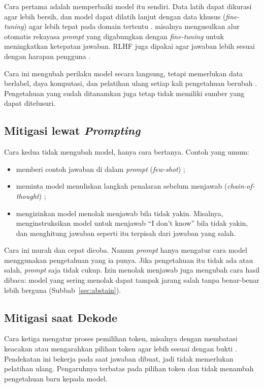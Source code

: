 Cara pertama adalah memperbaiki model itu sendiri. Data latih dapat dikurasi agar lebih bersih, dan model dapat dilatih lanjut dengan data khusus (\emph{fine-tuning}) agar lebih tepat pada domain tertentu \autocite{Patil2024, Hendawi2026}. \textcite{Hendawi2026} misalnya mengusulkan alur otomatis rekayasa \emph{prompt} yang digabungkan dengan \emph{fine-tuning} untuk meningkatkan ketepatan jawaban. RLHF juga dipakai agar jawaban lebih sesuai dengan harapan pengguna \autocite{Ouyang2022}.

Cara ini mengubah perilaku model secara langsung, tetapi memerlukan data berlabel, daya komputasi, dan pelatihan ulang setiap kali pengetahuan berubah \autocite{WangXL2026}. Pengetahuan yang sudah ditanamkan juga tetap tidak memiliki sumber yang dapat ditelusuri.

\subsection{Mitigasi lewat \emph{Prompting}}

Cara kedua tidak mengubah model, hanya cara bertanya. Contoh yang umum:
\begin{itemize}
  \item memberi contoh jawaban di dalam \emph{prompt} (\emph{few-shot})
\autocite{Brown2020};
  \item meminta model menuliskan langkah penalaran sebelum menjawab
(\emph{chain-of-thought}) \autocite{Wei2022};
  \item mengizinkan model menolak menjawab bila tidak yakin. Misalnya,
\textcite{Abedu2026} menginstruksikan model untuk menjawab ``I don't know'' bila tidak yakin, dan menghitung jawaban seperti itu terpisah dari jawaban yang salah.
\end{itemize}
Cara ini murah dan cepat dicoba. Namun \emph{prompt} hanya mengatur cara model menggunakan pengetahuan yang ia punya. Jika pengetahuan itu tidak ada atau salah, \emph{prompt} saja tidak cukup. Izin menolak menjawab juga mengubah cara hasil dibaca: model yang sering menolak dapat tampak jarang salah tanpa benar-benar lebih berguna (Subbab~\ref{sec:abstain}).

\subsection{Mitigasi saat Dekode}

Cara ketiga mengatur proses pemilihan token, misalnya dengan membatasi keacakan atau mengarahkan pilihan token agar lebih sesuai dengan bukti \autocite{Huang2025}. Pendekatan ini bekerja pada saat jawaban dibuat, jadi tidak memerlukan pelatihan ulang. Pengaruhnya terbatas pada pilihan token dan tidak menambah pengetahuan baru kepada model.

